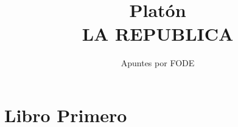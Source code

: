 \documentclass[10pt]{book}
\begin{document}
\normalfont

\author{\Large Apuntes por FODE}
\title{\small Platón \\ \vspace{1cm} \large LA REPUBLICA}
\date{}
\pagestyle{empty}
\maketitle
\thispagestyle{empty}
\let\cleardoublepage\clearpage
\tableofcontents								%


 
\let\cleardoublepage\clearpage

\chapter*{Libro Primero}
\end{document}
